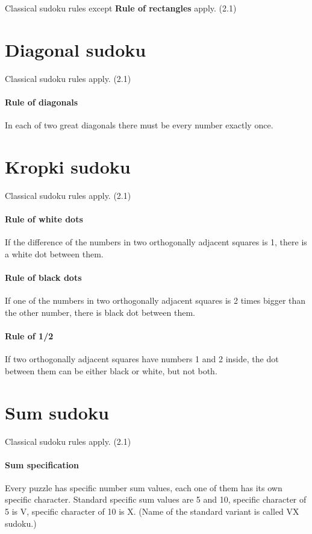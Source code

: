 \documentclass{report}
\begin{document}
Classical sudoku rules except \textbf{Rule of rectangles} apply. (2.1)

\section{Diagonal sudoku}

Classical sudoku rules apply. (2.1)

\paragraph{Rule of diagonals}
In each of two great diagonals there must be every number exactly once.
\section{Kropki sudoku}

Classical sudoku rules apply. (2.1)

\paragraph{Rule of white dots}
If the difference of the numbers in two orthogonally adjacent squares is 1, there is a white dot between them.

\paragraph{Rule of black dots}
If one of the numbers in two orthogonally adjacent squares is 2 times bigger than the other number, there is black dot between them.

\paragraph{Rule of 1/2}
If two orthogonally adjacent squares have numbers 1 and 2 inside, the dot between them can be either black or white, but not both.

\section{Sum sudoku}
Classical sudoku rules apply. (2.1)

\paragraph{Sum specification}
Every puzzle has specific number sum values, each one of them has its own specific character. Standard specific sum values are 5 and 10, specific character of 5 is V, specific character of 10 is X. (Name of the standard variant is called VX sudoku.)
\end{document}
